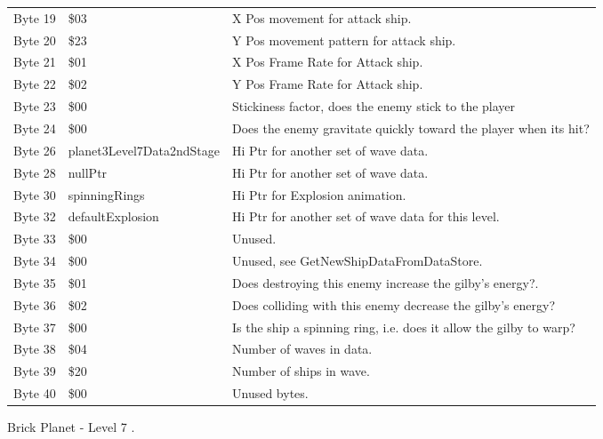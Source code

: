 \begin{figure}[H]
{\begin{adjustbox}{width=12cm}
\begin{tabular}{lll}
 Byte 19 & \$03                       & X Pos movement for attack ship.                                    \\
 Byte 20 & \$23                       & Y Pos movement pattern for attack ship.                            \\
 Byte 21 & \$01                       & X Pos Frame Rate for Attack ship.                                  \\
 Byte 22 & \$02                       & Y Pos Frame Rate for Attack ship.                                  \\
 Byte 23 & \$00                       & Stickiness factor, does the enemy stick to the player              \\
 Byte 24 & \$00                       & Does the enemy gravitate quickly toward the player when its hit?   \\
 Byte 26 & planet3Level7Data2ndStage & Hi Ptr for another set of wave data.                               \\
 Byte 28 & nullPtr                   & Hi Ptr for another set of wave data.                               \\
 Byte 30 & spinningRings             & Hi Ptr for Explosion animation.                                    \\
 Byte 32 & defaultExplosion          & Hi Ptr for another set of wave data for this level.                \\
 Byte 33 & \$00                       & Unused.                                                            \\
 Byte 34 & \$00                       & Unused, see GetNewShipDataFromDataStore.                           \\
 Byte 35 & \$01                       & Does destroying this enemy increase the gilby's energy?.           \\
 Byte 36 & \$02                       & Does colliding with this enemy decrease the gilby's energy?        \\
 Byte 37 & \$00                       & Is the ship a spinning ring, i.e. does it allow the gilby to warp? \\
 Byte 38 & \$04                       & Number of waves in data.                                           \\
 Byte 39 & \$20                       & Number of ships in wave.                                           \\
 Byte 40 & \$00                       & Unused bytes.                                                      \\
\bottomrule
\end{tabular}

  \end{adjustbox}

  }\caption*{Brick Planet - Level 7
.}
\end{figure}

